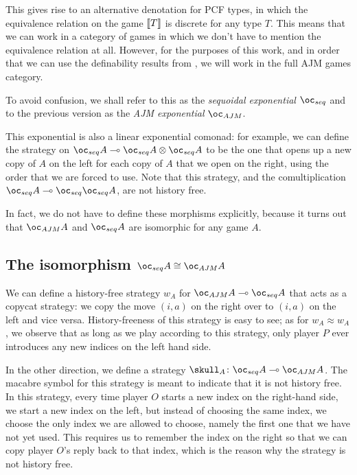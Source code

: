 \documentclass{article}
\newcommand{\ocajm}{\oc_{AJM}}
\newcommand{\ocseq}{\oc_{seq}}
\begin{document}
This gives rise to an alternative denotation for PCF types, in which the equivalence relation on the game $\left\llbracket T\right\rrbracket$ is discrete for any type $T$.  
This means that we can work in a category of games in which we don't have to mention the equivalence relation at all.  
However, for the purposes of this work, and in order that we can use the definability results from \cite{ajmPcf}, we will work in the full AJM games category.

To avoid confusion, we shall refer to this as the \emph{sequoidal exponential} $\oc_{seq}$ and to the previous version as the \emph{AJM exponential} $\oc_{AJM}$.

This exponential is also a linear exponential comonad: for example, we can define the strategy on $\ocseq A \implies \ocseq A \tensor \ocseq A$ to be the one that opens up a new copy of $A$ on the left for each copy of $A$ that we open on the right, using the order that we are forced to use. Note that this strategy, and the comultiplication $\ocseq A \implies \ocseq \ocseq A$, are not history free.

In fact, we do not have to define these morphisms explicitly, because it turns out that $\ocajm A$ and $\ocseq A$ are isomorphic for any game $A$.

\subsection{The isomorphism $\ocseq A \cong \ocajm A$}

We can define a history-free strategy $w_A$ for $\ocajm A\implies \ocseq A$ that acts as a copycat strategy: we copy the move $(i,a)$ on the right over to $(i,a)$ on the left and vice versa.  
History-freeness of this strategy is easy to see; as for $w_A \approx w_A$, we observe that as long as we play according to this strategy, only player $P$ ever introduces any new indices on the left hand side.

In the other direction, we define a strategy $\skull_A\from \ocseq A \implies \ocajm A$. The macabre symbol for this strategy is meant to indicate that it is not history free.  
In this strategy, every time player $O$ starts a new index on the right-hand side, we start a new index on the left, but instead of choosing the same index, we choose the only index we are allowed to choose, namely the first one that we have not yet used. 
This requires us to remember the index on the right so that we can copy player $O$'s reply back to that index, which is the reason why the strategy is not history free.
\end{document}
